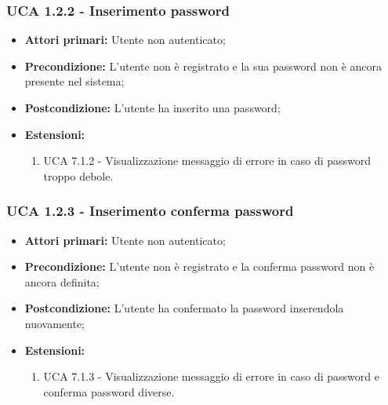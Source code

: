 \subsubsection{UCA 1.2.2 - Inserimento password}%
\begin{itemize}
\item \textbf{Attori primari:} Utente non autenticato;
\item \textbf{Precondizione:} L'utente non è registrato e la sua password non è ancora presente nel sistema;
\item \textbf{Postcondizione:} L'utente ha inserito una password;
\item \textbf{Estensioni:}
	\begin{enumerate}
		\item UCA 7.1.2 - Visualizzazione messaggio di errore in caso di password troppo debole.
	\end{enumerate}
\end{itemize}

\subsubsection{UCA 1.2.3 - Inserimento conferma password}%
\begin{itemize}
\item \textbf{Attori primari:} Utente non autenticato;
\item \textbf{Precondizione:} L'utente non è registrato e la conferma password non è ancora definita;
\item \textbf{Postcondizione:} L'utente ha confermato la password inserendola nuovamente;
\item \textbf{Estensioni:}
	\begin{enumerate}
		\item UCA 7.1.3 - Visualizzazione messaggio di errore in caso di password e conferma password diverse.
	\end{enumerate}
\end{itemize}